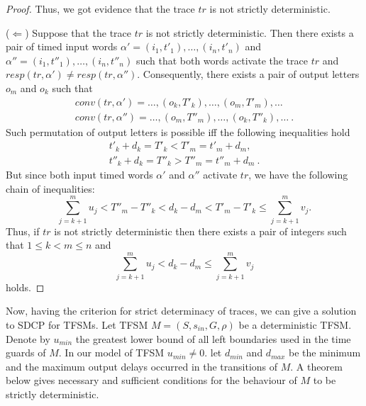 \documentclass[conference]{IEEEtran}
\begin{document}
\begin{proof}
Thus, we got evidence that the trace $tr$ is not strictly deterministic.
\smallskip

\noindent
($\Leftarrow$) Suppose that the trace $tr$ is not strictly deterministic. Then there exists a pair of timed input words $\alpha' = (i_1, t'_1), \dots, (i_n, t'_n)$ and $\alpha'' = (i_1, t''_1), \dots, (i_n, t''_n)$ such that both words activate the trace $tr$ and $resp(tr, \alpha') \neq resp(tr, \alpha'')$. Consequently, there exists a pair of output letters $o_m$ and $o_k$ such that 
$$\begin{array}{l}
conv(tr, \alpha') = \dots, (o_k, T'_k), \dots, (o_m, T'_m), \dots\\
conv(tr, \alpha'') = \dots, (o_m, T''_m), \dots, (o_k, T''_k), \dots \ .
\end{array}
$$ 
Such permutation of output letters is possible iff the following inequalities hold  
$$
\begin{array}{l}
t'_k + d_k = T'_k < T'_m=t'_m + d_m ,\\
t''_k + d_k = T''_k > T''_m=t''_m + d_m  \ .
\end{array}
$$
But since both input timed words $\alpha'$ and $\alpha''$ activate $tr$, we have the following chain of inequalities: \\
$$
\sum\limits_{j = k + 1}^{m}u_j < T''_m - T''_k < d_k - d_m < T'_m - T'_k \leq \sum\limits_{j = k + 1}^{m}v_j.
$$
Thus, if $tr$ is not strictly deterministic then there exists a pair of integers such that $1 \leq k < m \leq n$ and 
$$
\sum\limits_{j = k + 1}^{m}u_j < d_k - d_m \leq \sum\limits_{j = k + 1}^{m}v_j 
$$
holds.
\end{proof}


Now, having the criterion for strict determinacy of traces, we can give a solution to SDCP for TFSMs. Let TFSM $M = (S, s_{in}, G, \rho)$ be a deterministic TFSM. Denote by $u_{min}$ the greatest lower bound of all left boundaries used in the time guards of $M$. In our model of TFSM $u_{min}\ne 0$. let $d_{min}$ and $d_{max}$ be the minimum and the maximum output delays occurred in the transitions of $M$. A theorem below gives necessary and sufficient conditions for the behaviour of $M$ to be strictly deterministic.
\end{document}
